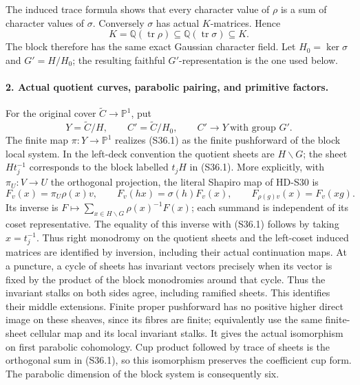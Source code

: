 The induced trace formula shows that every character value of
\(\rho\) is a sum of character values of \(\sigma\).
Conversely \(\sigma\) has actual \(K\)-matrices. Hence
\[
       K=\mathbb Q(\operatorname{tr}\rho)
        \subseteq\mathbb Q(\operatorname{tr}\sigma)
        \subseteq K.                                       \tag{S36.2}
\]
The block therefore has the same exact Gaussian character field.
Let \(H_0=\ker\sigma\) and \(G'=H/H_0\); the resulting faithful
\(G'\)-representation is the one used below.

\paragraph{2. Actual quotient curves, parabolic pairing, and primitive factors.}
For the original cover \(\widetilde C\to\mathbb P^1\), put
\[
       Y=\widetilde C/H,\qquad C'=\widetilde C/H_0,
       \qquad C'\longrightarrow Y\ \text{with group }G'.
                                                               \tag{S36.3}
\]
The finite map \(\pi:Y\to\mathbb P^1\) realizes (S36.1) as the
finite pushforward of the block local system. In the left-deck
convention the quotient sheets are \(H\backslash G\); the sheet
\(Ht_j^{-1}\) corresponds to the block labelled \(t_jH\)
in (S36.1). More explicitly, with \(\pi_U:V\to U\) the
orthogonal projection, the literal Shapiro map of HD-S30 is
\[
 F_v(x)=\pi_U\rho(x)v,\qquad F_v(hx)=\sigma(h)F_v(x),
 \qquad F_{\rho(g)v}(x)=F_v(xg).
\]
Its inverse is
\(F\mapsto\sum_{x\in H\backslash G}\rho(x)^{-1}F(x)\);
each summand is independent of its coset representative.
The equality of this inverse with (S36.1) follows by taking
\(x=t_j^{-1}\). Thus right monodromy on the quotient sheets
and the left-coset induced matrices are identified by inversion,
including their actual continuation maps.
At a puncture, a cycle of sheets has invariant vectors precisely
when its vector is fixed by the product of the block monodromies
around that cycle. Thus the invariant stalks on both sides agree,
including ramified sheets. This identifies their middle extensions.
Finite proper pushforward has no positive higher direct image on
these sheaves, since its fibres are finite; equivalently use the
same finite-sheet cellular map and its local invariant stalks.
It gives the actual isomorphism on first parabolic cohomology.
Cup product followed by trace of sheets is the orthogonal sum in
(S36.1), so this isomorphism preserves the coefficient cup form.
The parabolic dimension of the block system is consequently six.

